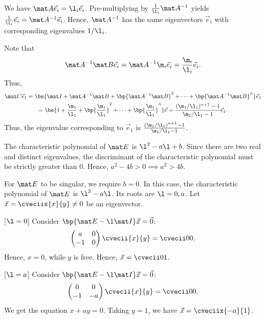 \begin{solution}
    \begin{ppart}
        \begin{psubpart}
            We have $\mat A \vec e_i = \l_i \vec e_i$. Pre-multiplying by $\frac1{\l_i} \mat A^{-1}$ yields $\frac1{\l_i} \vec e_i = \mat A^{-1} \vec e_i$. Hence, $\mat A^{-1}$ has the same eigenvectors $\vec e_i$ with corresponding eigenvalues $1/\l_i$.
        \end{psubpart}
        \begin{psubpart}
            Note that \[\mat A^{-1} \mat B \vec e_i = \mat A^{-1} \m_i \vec e_i = \frac{\m_i}{\l_i} \vec e_i.\] Thus,
            \begin{gather*}
                \mat C \vec e_1 = \bs{\mat I + \mat A^{-1} \mat B + \bp{\mat A^{-1} \mat B}^2 + \dots + \bp{\mat A^{-1} \mat B}^n} \vec e_1\\
                = \bs{1 + \frac{\m_1}{\l_1} + \bp{\frac{\m_1}{\l_1}}^2 + \dots + \bp{\frac{\m_1}{\l_1}}^n} \vec e = \frac{(\m_1/\l_1)^{n+1} - 1}{\m_1/\l_1 - 1} \vec e_1.
            \end{gather*}
            Thus, the eigenvalue corresponding to $\vec e_1$ is $\frac{(\m_1/\l_1)^{n+1} - 1}{\m_1/\l_1 - 1}$.
        \end{psubpart}
    \end{ppart}
    \begin{ppart}
        \begin{psubpart}
            The characteristic polynomial of $\mat E$ is $\l^2 - a \l + b$. Since there are two real and distinct eigenvalues, the discriminant of the characteristic polynomial must be strictly greater than 0. Hence, $a^2 - 4b > 0 \implies a^2 > 4b$.
        \end{psubpart}
        \begin{psubpart}
            For $\mat E$ to be singular, we require $b = 0$. In this case, the characteristic polynomial of $\mat E$ is $\l^2 - a\l$. Its roots are $\l = 0, a$. Let $\vec x = \cveciix{x}{y} \neq 0$ be an eigenvector.

            [$\l = 0$] Consider $\bp{\mat E - \l \mat I} \vec x = \vec 0$: \[\begin{pmatrix}a & 0 \\ -1 & 0 \end{pmatrix}\cvecii{x}{y} = \cvecii00.\] Hence, $x = 0$, while $y$ is free. Hence, $\vec x = \cvecii01$.

            [$\l = a$] Consider $\bp{\mat E - \l \mat I} \vec x = \vec 0$: \[\begin{pmatrix}0 & 0 \\ -1 & -a\end{pmatrix} \cvecii{x}{y} = \cvecii00.\] We get the equation $x + ay = 0$. Taking $y = 1$, we have $\vec x = \cveciix{-a}{1}$.


\end{psubpart}
\end{ppart}
\end{solution}
